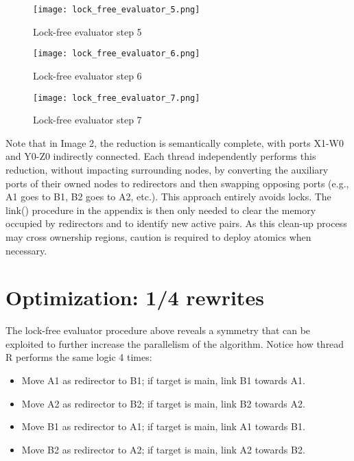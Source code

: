 \documentclass{article}
\begin{document}
\begin{figure}[h!]
\centering
\texttt{[image: lock\_free\_evaluator\_5.png]}
\caption{Lock-free evaluator step 5}
\end{figure}

\begin{figure}[h!]
\centering
\texttt{[image: lock\_free\_evaluator\_6.png]}
\caption{Lock-free evaluator step 6}
\end{figure}

\begin{figure}[h!]
\centering
\texttt{[image: lock\_free\_evaluator\_7.png]}
\caption{Lock-free evaluator step 7}
\end{figure}

Note that in Image 2, the reduction is semantically complete, with ports X1-W0 and Y0-Z0 indirectly connected. Each thread independently performs this reduction, without impacting surrounding nodes, by converting the auxiliary ports of their owned nodes to redirectors and then swapping opposing ports (e.g., A1 goes to B1, B2 goes to A2, etc.). This approach entirely avoids locks. The link() procedure in the appendix is then only needed to clear the memory occupied by redirectors and to identify new active pairs. As this clean-up process may cross ownership regions, caution is required to deploy atomics when necessary.

\section{Optimization: 1/4 rewrites}\label{s:lockfree}

The lock-free evaluator procedure above reveals a symmetry that can be exploited to further increase the parallelism of the algorithm. Notice how thread R performs the same logic 4 times:

\begin{itemize}
  \item Move A1 as redirector to B1; if target is main, link B1 towards A1.
  \item Move A2 as redirector to B2; if target is main, link B2 towards A2.
  \item Move B1 as redirector to A1; if target is main, link A1 towards B1.
  \item Move B2 as redirector to A2; if target is main, link A2 towards B2.
\end{itemize}
\end{document}
